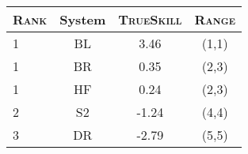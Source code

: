 \begin{tabular}{l|ccc} 
\hline
\textsc{Rank} & System & \textsc{TrueSkill} & \textsc{Range}\\
\hline 
1 & \textsc{BL} & 3.46   & (1,1)  \\
1 & \textsc{BR} & 0.35   & (2,3)  \\
1 & \textsc{HF} & 0.24   & (2,3) \\
2 & \textsc{S2} & -1.24  & (4,4) \\
3 & \textsc{DR} & -2.79  & (5,5) \\
\end{tabular}